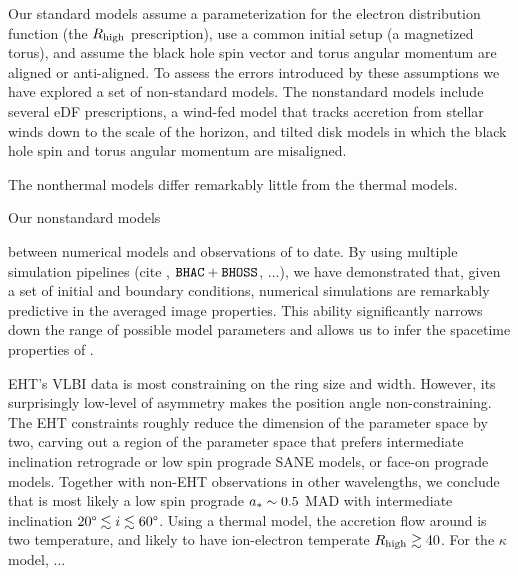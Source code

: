 Our standard models assume a parameterization for the electron distribution function (the $R_\mathrm{high}$ prescription), use a common initial setup (a magnetized torus), and assume the black hole spin vector and torus angular momentum are aligned or anti-aligned.  To assess the errors introduced by these assumptions we have explored a set of non-standard models.  The nonstandard models include several eDF prescriptions, a wind-fed model that tracks accretion from stellar winds down to the scale of the horizon, and tilted disk models in which the black hole spin and torus angular momentum are misaligned.

The nonthermal models differ remarkably little from the thermal models.  

Our nonstandard models 

between numerical models and observations of \sgra to date.
By using multiple simulation pipelines (cite \patoka, $\texttt{BHAC}+\texttt{BHOSS}$,
...), we have demonstrated that, given a set of initial and boundary
conditions, numerical simulations are remarkably predictive in the
averaged image properties.
This ability significantly narrows down the range of possible model
parameters and allows us to infer the spacetime properties of \sgra
{}.

EHT's VLBI data is most constraining on the ring size and width.
However, its surprisingly low-level of asymmetry makes the position
angle non-constraining.
The EHT constraints roughly reduce the dimension of the parameter
space by two, carving out a region of the parameter space that prefers
intermediate inclination retrograde or low spin prograde SANE models,
or face-on prograde models.
Together with non-EHT observations in other wavelengths, we conclude
that \sgra is most likely a low spin prograde $a_* \sim 0.5$ MAD with
intermediate inclination $20\degree \lesssim i \lesssim 60\degree$.
Using a thermal model, the accretion flow around \sgra is two
temperature, and likely to have ion-electron temperate $R_\mathrm{high} \gtrsim
40$.
For the $\kappa$ model, ...

